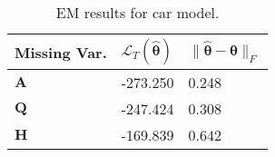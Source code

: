 \begin{table}[tb]
\caption{EM results for car model.}
\label{tab: EM results}
\begin{tabular}{lll}
\toprule
\textbf{Missing Var.} & \textbf{$\mathcal{L}_T(\widehat{\boldsymbol{\theta}})$} & \textbf{$\| \widehat{\boldsymbol{\theta}} - \boldsymbol{\theta} \|_F$} \\
\midrule
$\mathbf{A}$ & -273.250 & 0.248 \\
$\mathbf{Q}$ & -247.424 & 0.308 \\
$\mathbf{H}$ & -169.839 & 0.642 \\
\bottomrule
\end{tabular}
\end{table}
